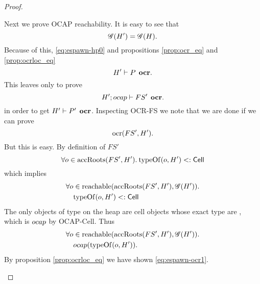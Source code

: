 \begin{proof}
\begin{description}
      Next we prove OCAP reachability. It is easy to see that
      \begin{equation} \label{eq:espawn-ocr0}
        \mathscr{G}(H') = \mathscr{G}(H).
      \end{equation}
      Because of this, \eqref{eq:espawn-hp0} and propositions \ref{prop:ocr_eq}
      and \ref{prop:ocrloc_eq}
      \begin{equation}
        H' \vdash P \:\: \mbox{\bf ocr}.
      \end{equation}
      This leaves only to prove
      \begin{equation}
        H'; \mbox{$ocap$} \vdash FS' \:\: \mbox{\bf ocr}.
      \end{equation}
      in order to get $H' \vdash P' \:\: \mbox{\bf ocr}$.
      Inspecting {\sc OCR-FS} we note that we are done if we can prove
      \begin{equation} \label{eq:espawn-ocr1}
        \mbox{$\mathrm{ocr}$}(FS', H').
      \end{equation}
      But this is easy. By definition of $FS'$
      \begin{equation}
        \forall o \in \mbox{$\mathrm{accRoots}$}(FS', H'). \: \mbox{$\mathrm{typeOf}$}(o, H') <: \mbox{$\mathsf{Cell}$}
      \end{equation}
      which implies
      \begin{equation} \label{eq:espawn-ocr2}
        \begin{aligned}
          \forall o &\in \mbox{$\mathrm{reachable}$}(\mbox{$\mathrm{accRoots}$}(FS', H'), \mathscr{G}(H')). \\
            &\mbox{$\mathrm{typeOf}$}(o, H') <: \mbox{$\mathsf{Cell}$}
        \end{aligned}
      \end{equation}
      The only objects of type \CellType{} on the heap are cell objects 
      whose exact type are \CellType{}, which is $\mbox{$ocap$}$ by {\sc OCAP-Cell}.
      Thus
      \begin{equation}
        \begin{aligned}
          \forall o &\in \mbox{$\mathrm{reachable}$}(\mbox{$\mathrm{accRoots}$}(FS', H'), \mathscr{G}(H')). \\
            &\mbox{$ocap$}(\mbox{$\mathrm{typeOf}$}(o, H')).
        \end{aligned}
      \end{equation}
      By proposition \ref{prop:ocrloc_eq} we have shown \eqref{eq:espawn-ocr1}.


\end{description}
\end{proof}
